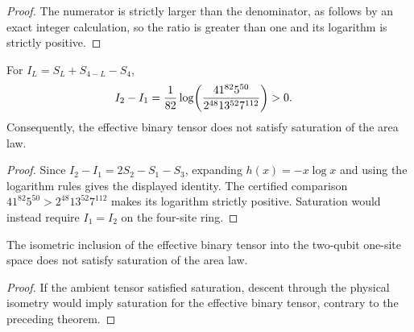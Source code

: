 \begin{proof}
    \leanok
    The numerator is strictly larger than the denominator, as follows by an
    exact integer calculation, so the ratio is greater than one and its
    logarithm is strictly positive.
\end{proof}

\begin{lemma}
    \label{thm:cpsv_example411_length_four_mutual_information_obstruction}
    \leanok
    For $I_L=S_L+S_{4-L}-S_4$,
    \begin{align}
        I_2-I_1
         & =\frac1{82}\log\!\left(
        \frac{41^{82}5^{50}}{2^{48}13^{52}7^{112}}\right)>0.
        \notag
    \end{align}
    Consequently, the effective binary tensor does not satisfy saturation of
    the area law.
\end{lemma}

\begin{proof}
    \leanok
    Since $I_2-I_1=2S_2-S_1-S_3$, expanding
    $h(x)=-x\log x$ and using the logarithm rules gives the displayed identity.
    The certified comparison
    $41^{82}5^{50}>2^{48}13^{52}7^{112}$ makes its logarithm strictly positive.
    Saturation would instead require $I_1=I_2$ on the four-site ring.
\end{proof}

\begin{lemma}
    \label{thm:cpsv_example411_ambient_not_sal}
    \leanok
    The isometric inclusion of the effective binary tensor into the
    two-qubit one-site space does not satisfy saturation of the area law.
\end{lemma}

\begin{proof}
    \leanok
    If the ambient tensor satisfied saturation, descent through the physical
    isometry would imply saturation for the effective binary tensor, contrary
    to the preceding theorem.
\end{proof}

